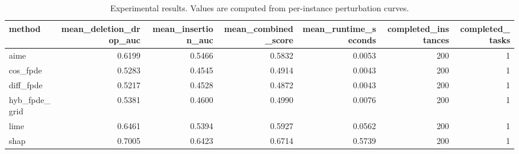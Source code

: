 \begin{table}[t]
\caption{Experimental results. Values are computed from per-instance perturbation curves.}
\label{tab:main_results_computed}
\centering
\begin{tabular}{lrrrrrr}
\toprule
method & mean\_deletion\_drop\_auc & mean\_insertion\_auc & mean\_combined\_score & mean\_runtime\_seconds & completed\_instances & completed\_tasks \\
\midrule
aime & 0.6199 & 0.5466 & 0.5832 & 0.0053 & 200 & 1 \\
cos\_fpde & 0.5283 & 0.4545 & 0.4914 & 0.0043 & 200 & 1 \\
diff\_fpde & 0.5217 & 0.4528 & 0.4872 & 0.0043 & 200 & 1 \\
hyb\_fpde\_grid & 0.5381 & 0.4600 & 0.4990 & 0.0076 & 200 & 1 \\
lime & 0.6461 & 0.5394 & 0.5927 & 0.0562 & 200 & 1 \\
shap & 0.7005 & 0.6423 & 0.6714 & 0.5739 & 200 & 1 \\
\bottomrule
\end{tabular}

\end{table}
